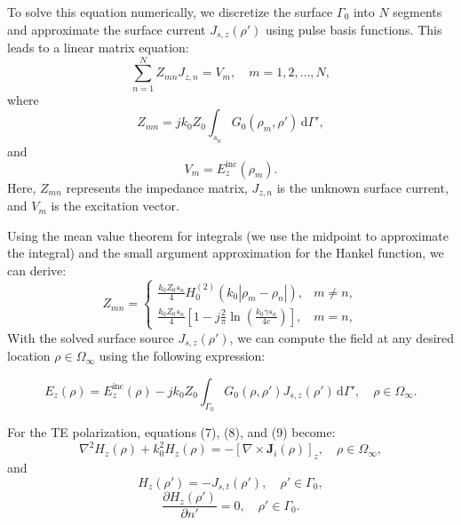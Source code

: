 \documentclass[10pt,a4paper]{article}
\begin{document}
To solve this equation numerically, we discretize the surface $\Gamma_0$ into $N$ segments and approximate the surface current $J_{s,z}(\rho')$ using pulse basis functions. This leads to a linear matrix equation:
\begin{equation}
\sum_{n=1}^N Z_{mn} J_{z,n} = V_m, \quad m = 1, 2, \dots, N,
\end{equation}
where
\begin{equation}
Z_{mn} = jk_0 Z_0 \int_{s_n} G_0(\rho_m, \rho') \, \mathrm{d}\Gamma',
\end{equation}
and
\begin{equation}
V_m = E_z^{\text{inc}}(\rho_m).
\end{equation}
Here, $Z_{mn}$ represents the impedance matrix, $J_{z,n}$ is the unknown surface current, and $V_m$ is the excitation vector.

Using the mean value theorem for integrals (we use the midpoint to approximate the integral) and the small argument approximation for the Hankel function, we can derive:
\begin{equation}
Z_{mn} =
\begin{cases}
\frac{k_0 Z_0 s_n}{4} H_0^{(2)}(k_0 |\rho_m - \rho_n|), & m \neq n, \\
\frac{k_0 Z_0 s_n}{4} \left[ 1 - j \frac{2}{\pi} \ln\left(\frac{k_0 \gamma s_n}{4e}\right) \right], & m = n,
\end{cases}
\end{equation}
With the solved surface source $J_{s,z}(\rho')$, we can compute the field at any desired location $\rho \in \Omega_\infty$ using the following expression:

\begin{equation}
E_z(\rho) = E_z^{\text{inc}}(\rho) - jk_0 Z_0 \int_{\Gamma_0} G_0(\rho, \rho') J_{s,z}(\rho') \, \mathrm{d}\Gamma', \quad \rho \in \Omega_\infty.
\end{equation}

For the TE polarization, equations (7), (8), and (9) become:
\begin{equation}
\nabla^2 H_z(\rho) + k_0^2 H_z(\rho) = -[\nabla \times \mathbf{J}_i(\rho)]_z, \quad \rho \in \Omega_\infty,
\end{equation}
and
\begin{equation}
H_z(\rho') = -J_{s,t}(\rho'), \quad \rho' \in \Gamma_0,
\end{equation}
\begin{equation}
\frac{\partial H_z(\rho')}{\partial n'} = 0, \quad \rho' \in \Gamma_0.
\end{equation}
\end{document}

